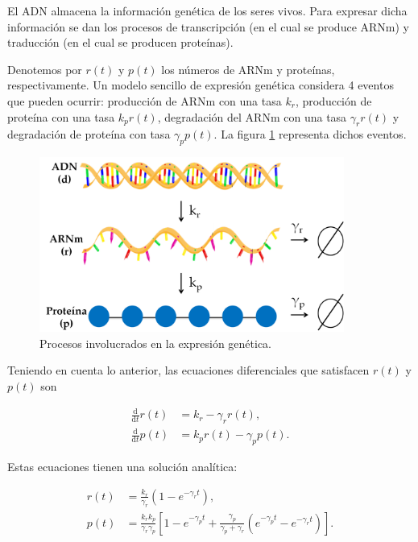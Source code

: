 \documentclass[11pt,letterpaper]{exam}
\begin{document}
\begin{questions}

El ADN almacena la informaci\'on gen\'etica de los seres vivos. Para
expresar dicha informaci\'on se dan los procesos de transcripci\'on
(en el cual se produce ARNm) y traducci\'on (en el cual se producen
prote\'inas).   

Denotemos por $r(t)$ y $p(t)$ los n\'umeros de ARNm y prote\'inas,
respectivamente. Un modelo sencillo de expresi\'on gen\'etica
considera 4 eventos que pueden ocurrir: producci\'on de ARNm con una
tasa $k_r$, producci\'on de prote\'ina con una tasa $k_p r(t)$,
degradaci\'on del ARNm con una tasa $\gamma_rr(t)$ y degradaci\'on de
prote\'ina con tasa $\gamma_pp(t)$. La figura \ref{fig:con-dogma}
representa dichos eventos. 

\begin{figure}[H]
  \centering
  \includegraphics[width=10cm]{Pmas-dogma}
  \caption{\label{fig:con-dogma} Procesos involucrados en la expresi\'on gen\'etica.}
\end{figure}

Teniendo en cuenta lo anterior, las ecuaciones diferenciales que
satisfacen $r(t)$ y $p(t)$ son 

\begin{equation}
\label{eq:dif}
\begin{split}
\frac{\mathrm{d}}{\mathrm{d}t}r(t) &= k_r - \gamma_r r(t),\\
\frac{\mathrm{d}}{\mathrm{d}t}p(t) &= k_pr(t) - \gamma_p p(t).
\end{split}
\end{equation}

Estas ecuaciones tienen una soluci\'on anal\'itica:


\begin{equation}
\label{eq:det}
\begin{split}
r(t) &= \frac{k_r}{\gamma_r}\left(1-e^{-\gamma_rt}\right),\\
p(t) &= \frac{k_rk_p}{\gamma_r\gamma_p}\left[1-e^{-\gamma_pt}+\frac{\gamma_p}{\gamma_p+\gamma_r}\left(e^{-\gamma_pt}-e^{-\gamma_rt}\right)\right].
\end{split}
\end{equation} 


\end{questions}
\end{document}
